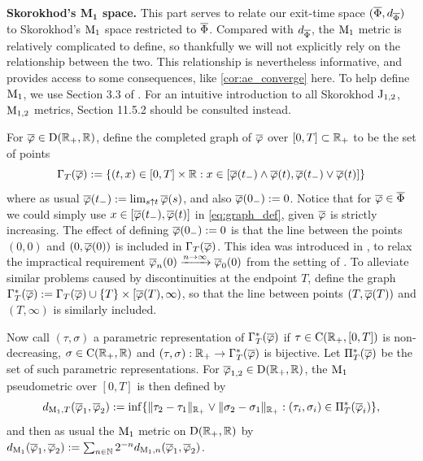 \vspace{3mm}\textbf{Skorokhod's M$\mathbf{{}_1}$ space.} This part serves to relate our exit-time space $(\overline{\Phi},d_{\overline{\Phi}})$ to Skorokhod's $\mathrm{M}_1$ space restricted to $\overline{\Phi}$. Compared with $d_{\overline{\Phi}}$, the $\mathrm{M}_1$ metric is relatively complicated to define, so thankfully we will not explicitly rely on the relationship between the two. This relationship is nevertheless informative, and provides access to some consequences, like \autoref{cor:ae_converge} here. To help define $\mathrm{M}_1$, we use Section 3.3 of \cite{whitt_2002}. For an intuitive introduction to all Skorokhod $\mathrm{J}_{1,2}$, $\mathrm{M}_{1,2}$ metrics, Section 11.5.2 should be consulted instead.

For $\overline{\varphi}\in\mathrm{D}(\mathbb{R}_+,\mathbb{R})$, define the completed graph of $\overline{\varphi}$ over $[0,T]\subset\mathbb{R}_+$ to be the set of points
\begin{equation}\label{eq:graph_def}
    \Gamma_T(\overline{\varphi}) := \{(t,x)\in[0,T]\times\mathbb{R}: x\in[\overline{\varphi}(t_-)\wedge\overline{\varphi}(t),\overline{\varphi}(t_-)\vee\overline{\varphi}(t)]\}
\end{equation}
where as usual $\overline{\varphi}(t_-):=\lim_{s\uparrow t}\overline{\varphi}(s)$, and also $\overline{\varphi}(0_-):=0$. Notice that for $\overline{\varphi}\in\overline{\Phi}$ we could simply use $x\in[\overline{\varphi}(t_-),\overline{\varphi}(t)]$ in \autoref{eq:graph_def}, given $\overline{\varphi}$ is strictly increasing. The effect of defining $\overline{\varphi}(0_-):=0$ is that the line between the points $(0,0)$ and $(0,\overline{\varphi}(0))$ is included in $\Gamma_T(\overline{\varphi})$. This idea was introduced in \cite{puhalskii_1997}, to relax the impractical requirement $\overline{\varphi}_n(0)\xrightarrow{n\to\infty}\overline{\varphi}_0(0)$ from the setting of \cite{skorokhod_1956}. To alleviate similar problems caused by discontinuities at the endpoint $T$, define the graph $\Gamma^*_T(\overline{\varphi}):=\Gamma_T(\overline{\varphi})\cup\{T\}\times[\overline{\varphi}(T),\infty)$, so that the line between points $(T,\overline{\varphi}(T))$ and $(T,\infty)$ is similarly included.

Now call $(\tau,\sigma)$ a parametric representation of $\Gamma^*_T(\overline{\varphi})$ if $\tau\in\mathrm{C}(\mathbb{R}_+,[0,T])$ is non-decreasing, $\sigma\in\mathrm{C}(\mathbb{R}_+,\mathbb{R})$ and $(\tau,\sigma):\mathbb{R}_+\to\Gamma^*_T(\overline{\varphi})$ is bijective. Let $\Pi^*_T(\overline{\varphi})$ be the set of such parametric representations. For $\overline{\varphi}_{1,2}\in\mathrm{D}(\mathbb{R}_+,\mathbb{R})$, the $\mathrm{M}_1$ pseudometric over $[0,T]$ is then defined by
\begin{equation}\label{eq:m1_metric}
    d_{\mathrm{M}_1,T}(\overline{\varphi}_1,\overline{\varphi}_2) := \inf\{\Vert \tau_2 - \tau_1 \Vert_{\mathbb{R}_+}\vee\Vert \sigma_2 - \sigma_1 \Vert_{\mathbb{R}_+} : (\tau_i,\sigma_i)\in\Pi^*_T(\overline{\varphi}_i)\},
\end{equation}
and then as usual the $\mathrm{M}_1$ metric on $\mathrm{D}(\mathbb{R}_+,\mathbb{R})$ by $d_{\mathrm{M}_1}(\overline{\varphi}_1,\overline{\varphi}_2) :=\sum_{n\in\mathbb{N}}2^{-n} d_{\mathrm{M}_1,n}(\overline{\varphi}_1,\overline{\varphi}_2)$.

